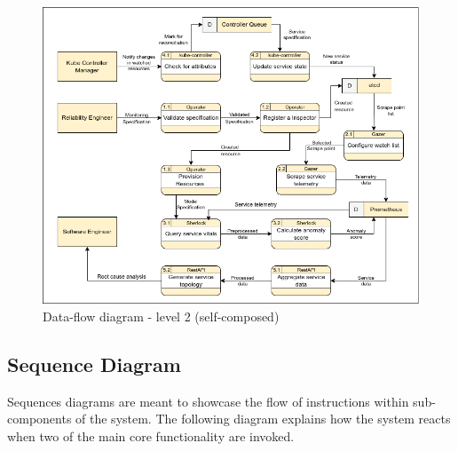 \begin{figure}[H]
    \includegraphics[width=13cm]{assets/system-design/data-flow-level-2.png}
    \caption{Data-flow diagram - level 2 (self-composed)}
\end{figure}


\subsection{Sequence Diagram}

Sequences diagrams are meant to showcase the flow of instructions within sub-components of the system. The following diagram explains how the system reacts when two of the main core functionality are invoked.

